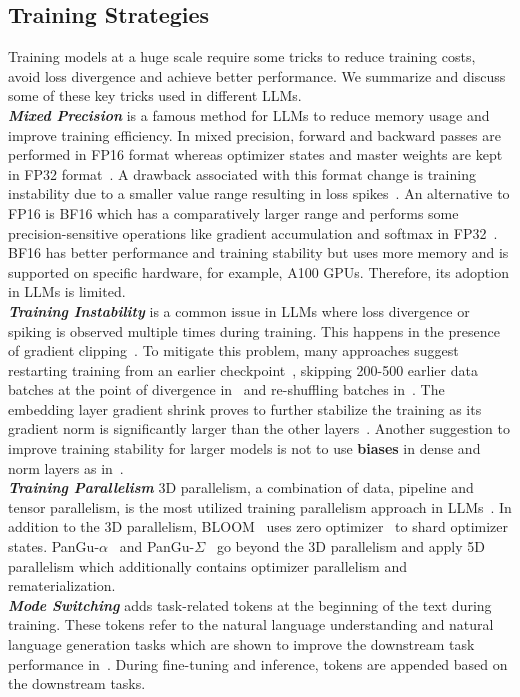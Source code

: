 \subsection{Training Strategies}
Training models at a huge scale require some tricks to reduce training costs, avoid loss divergence and achieve better performance. We summarize and discuss some of these key tricks used in different LLMs. \\
\emph{\textbf{Mixed Precision}} is a famous method for LLMs to reduce memory usage and improve training efficiency. In mixed precision, forward and backward passes are performed in FP16 format whereas optimizer states and master weights are kept in FP32 format~\cite{Mixed_Precision}. A drawback associated with this format change is training instability due to a smaller value range resulting in loss spikes~\cite{GLM-130B}. An alternative to FP16 is BF16 which has a comparatively larger range and performs some precision-sensitive operations like gradient accumulation and softmax in FP32~\cite{BLOOM}. BF16 has better performance and training stability but uses more memory and is supported on specific hardware, for example, A100 GPUs. Therefore, its adoption in LLMs is limited. \\ %
\emph{\textbf{Training Instability}} is a common issue in LLMs where loss divergence or spiking is observed multiple times during training. This happens in the presence of gradient clipping~\cite{PaLM}. To mitigate this problem, many approaches suggest restarting training from an earlier checkpoint~\cite{PaLM, GLM-130B, du2022glam}, skipping 200-500 earlier data batches at the point of divergence in~\cite{PaLM} and re-shuffling batches in~\cite{du2022glam}. The embedding layer gradient shrink proves to further stabilize the training as its gradient norm is significantly larger than the other layers~\cite{GLM-130B}. Another suggestion to improve training stability for larger models is not to use \textbf{biases} in dense and norm layers as in~\cite{PaLM}.    \\
\emph{\textbf{Training Parallelism}} 3D parallelism, a combination of data, pipeline and tensor parallelism, is the most utilized training parallelism approach in LLMs~\cite{GLM-130B, PaLM, OPT, BLOOM, mtnlg, wu2021yuan,lieber2021jurassic}. In addition to the 3D parallelism, BLOOM~\cite{BLOOM} uses zero optimizer~\cite{ZeroOpt} to shard optimizer states. PanGu-$\alpha$~\cite{PanGU_alpha} and PanGu-$\Sigma$~\cite{PanGu_sigma} go beyond the 3D parallelism and apply 5D parallelism which additionally contains optimizer parallelism and rematerialization.     \\
\emph{\textbf{Mode Switching}} adds task-related tokens at the beginning of the text during training. These tokens refer to the natural language understanding and natural language generation tasks which are shown to improve the downstream task performance in~\cite{UL2, U-PaLM, soltan2022alexatm}. During fine-tuning and inference, tokens are appended based on the downstream tasks.  \\
